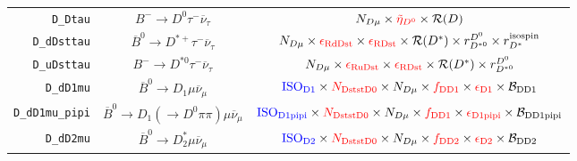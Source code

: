 \begin{landscape}
\begin{table}
\begin{tabular}{r|c|c}
         \texttt{D\_Dtau} &                   $B^- \rightarrow D^0 \tau^- \overline{\nu}_\tau$                   &                                                                                                                                            $N_{D \mu} \times \textcolor{red}{\tilde{\eta}_{D^0}} \times \mathcal{R}(D)$                                                                                                                                             \\
      \texttt{D\_dDsttau} &            $\overline{B}^0 \rightarrow D^{*+} \tau^- \overline{\nu}_\tau$            &                                                                                        $N_{D \mu} \times \textcolor{red}{\epsilon_\text{RdDst}} \times \textcolor{red}{\epsilon_\text{RDst}} \times \mathcal{R}(D^*) \times r_{D^{*0}}^{D^0} \times r_{D^*}^\text{isospin}$                                                                                         \\
      \texttt{D\_uDsttau} &                 $B^- \rightarrow D^{*0} \tau^- \overline{\nu}_\tau$                  &                                                                                                       $N_{D \mu} \times \textcolor{red}{\epsilon_\text{RuDst}} \times \textcolor{red}{\epsilon_\text{RDst}} \times \mathcal{R}(D^*) \times r_{D^{*0}}^{D^0}$                                                                                                        \\
        \texttt{D\_dD1mu} &               $\overline{B}^0 \rightarrow D_1 \mu \overline{\nu}_\mu$                &                                                                          $\textcolor{blue}{\text{ISO}_\text{D1}} \times \textcolor{red}{N_\text{DststD0}} \times N_{D \mu} \times \textcolor{red}{f_\text{DD1}} \times \textcolor{red}{\epsilon_\text{D1}} \times \mathcal{B}_\text{DD1}$                                                                           \\
  \texttt{D\_dD1mu\_pipi} &   $\overline{B}^0 \rightarrow D_1 (\rightarrow D^0 \pi\pi) \mu \overline{\nu}_\mu$   &                                                                    $\textcolor{blue}{\text{ISO}_\text{D1pipi}} \times \textcolor{red}{N_\text{DststD0}} \times N_{D \mu} \times \textcolor{red}{f_\text{DD1}} \times \textcolor{red}{\epsilon_\text{D1pipi}} \times \mathcal{B}_\text{DD1pipi}$                                                                     \\
        \texttt{D\_dD2mu} &              $\overline{B}^0 \rightarrow D^*_2 \mu \overline{\nu}_\mu$               &                                                                          $\textcolor{blue}{\text{ISO}_\text{D2}} \times \textcolor{red}{N_\text{DststD0}} \times N_{D \mu} \times \textcolor{red}{f_\text{DD2}} \times \textcolor{red}{\epsilon_\text{D2}} \times \mathcal{B}_\text{DD2}$                                                                           \\

\end{tabular}
\end{table}
\end{landscape}
